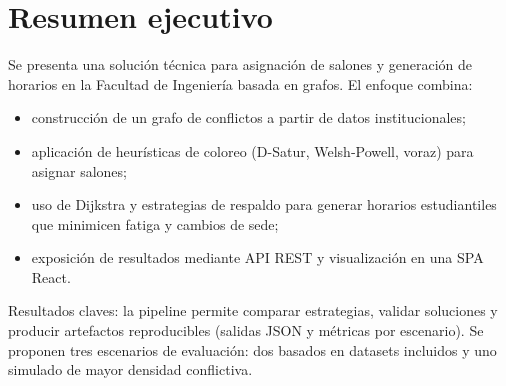 \chapter{Resumen ejecutivo}

Se presenta una solución técnica para asignación de salones y generación de horarios en la Facultad de Ingeniería basada en grafos. El enfoque combina:

\begin{itemize}[leftmargin=1.5cm]
  \item construcción de un grafo de conflictos a partir de datos institucionales;
  \item aplicación de heurísticas de coloreo (D-Satur, Welsh‑Powell, voraz) para asignar salones;
  \item uso de Dijkstra y estrategias de respaldo para generar horarios estudiantiles que minimicen fatiga y cambios de sede;
  \item exposición de resultados mediante API REST y visualización en una SPA React.
\end{itemize}

Resultados claves: la pipeline permite comparar estrategias, validar soluciones y producir artefactos reproducibles (salidas JSON y métricas por escenario). Se proponen tres escenarios de evaluación: dos basados en datasets incluidos y uno simulado de mayor densidad conflictiva.

